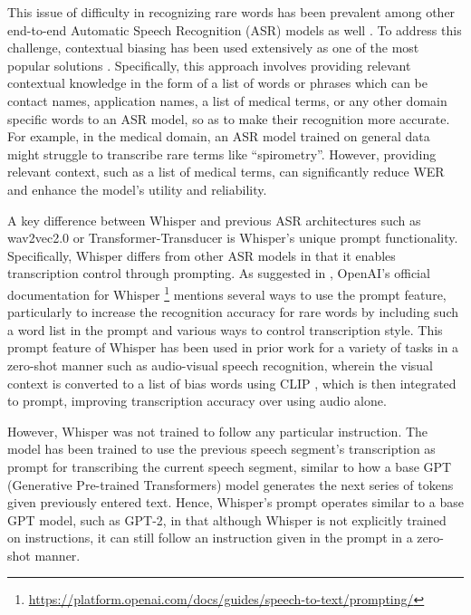 \documentclass{article}
\begin{document}
This issue of difficulty in recognizing rare words has been prevalent among other end-to-end Automatic Speech Recognition (ASR) models as well \cite{contextrnnt, personalizationctc}. To address this challenge, contextual biasing has been used extensively as one of the most popular solutions \cite{sathyendra2022contextual, tang2024improving}. Specifically, this approach involves providing relevant contextual knowledge in the form of a list of words or phrases which can be contact names, application names, a list of medical terms, or any other domain specific words to an ASR model, so as to make their recognition more accurate. For example, in the medical domain, an ASR model trained on general data might struggle to transcribe rare terms like ``spirometry''. However,  providing relevant context, such as a list of medical terms, can significantly reduce WER and enhance the model's utility and reliability.

A key difference between Whisper and previous ASR architectures such as wav2vec2.0 \cite{wav2vec2} or Transformer-Transducer \cite{transformertrans} is Whisper's unique prompt functionality. Specifically, Whisper differs from other ASR models in that it enables transcription control through prompting. As suggested in \cite{whisper}, OpenAI's official documentation for Whisper \footnote{\label{myfootnote}\href{https://platform.openai.com/docs/guides/speech-to-text/prompting/}{https://platform.openai.com/docs/guides/speech-to-text/prompting/}} mentions several ways to use the prompt feature, particularly to increase the recognition accuracy for rare words by including such a word list in the prompt and various ways to control transcription style. This prompt feature of Whisper has been used in prior work \cite{application3} for a variety of tasks in a zero-shot manner such as audio-visual speech recognition, wherein the visual context is converted to a list of bias words using CLIP \cite{clip}, which is then integrated to prompt, improving transcription accuracy over using audio alone. 

However, Whisper was not trained to follow any particular instruction. The model has been trained to use the previous speech segment's transcription as prompt for transcribing the current speech segment, similar to how a base GPT (Generative Pre-trained Transformers) \cite{gpt2} model generates the next series of tokens given previously entered text. Hence, Whisper's prompt operates similar to a base GPT model, such as GPT-2, in that although Whisper is not explicitly trained on instructions, it can still follow an instruction given in the prompt in a zero-shot manner. 
\end{document}
